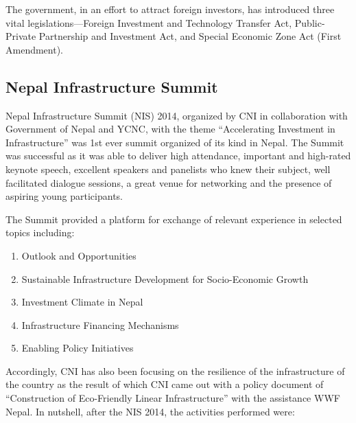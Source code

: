 \documentclass[
  openany]{book}
\begin{document}
The government, in an effort to attract foreign investors, has introduced three vital legislations---Foreign Investment and Technology Transfer Act, Public-Private Partnership and Investment Act, and Special Economic Zone Act (First Amendment).

\hypertarget{nepal-infrastructure-summit}{%
\subsection{Nepal Infrastructure Summit}\label{nepal-infrastructure-summit}}

Nepal Infrastructure Summit (NIS) 2014, organized by CNI in collaboration with Government of Nepal and YCNC, with the theme ``Accelerating Investment in Infrastructure'' was 1st ever summit organized of its kind in Nepal. The Summit was successful as it was able to deliver high attendance, important and high-rated keynote speech, excellent speakers and panelists who knew their subject, well facilitated dialogue sessions, a great venue for networking and the presence of aspiring young participants.

The Summit provided a platform for exchange of relevant experience in selected topics including:

\begin{enumerate}
\item Outlook and Opportunities
\item Sustainable Infrastructure Development for Socio-Economic Growth
\item Investment Climate in Nepal
\item Infrastructure Financing Mechanisms
\item Enabling Policy Initiatives
\end{enumerate}

Accordingly, CNI has also been focusing on the resilience of the infrastructure of the country as the result of which CNI came out with a policy document of ``Construction of Eco-Friendly Linear Infrastructure'' with the assistance WWF Nepal. In nutshell, after the NIS 2014, the activities performed were:
\end{document}
